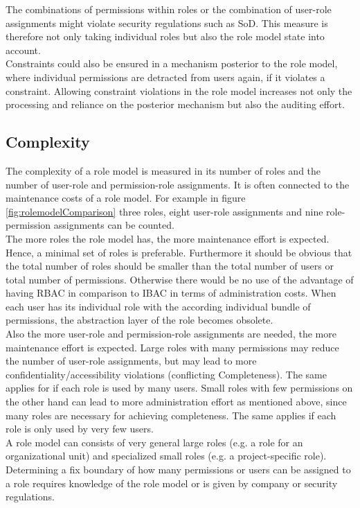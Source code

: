         The combinations of permissions within roles or the combination of user-role assignments might violate security regulations such as SoD. This measure is therefore not only taking individual roles but also the role model state into account.\\
        Constraints could also be ensured in a mechanism posterior to the role model, where individual permissions are detracted from users again, if it violates a constraint. Allowing constraint violations in the role model increases not only the processing and reliance on the posterior mechanism but also the auditing effort.
        \subsection{Complexity}
        The complexity of a role model is measured in its number of roles and the number of user-role and permission-role assignments. It is often connected to the maintenance costs of a role model. For example in figure \ref{fig:rolemodelComparison} three roles, eight user-role assignments and nine role-permission assignments can be counted.\\
        The more roles the role model has, the more maintenance effort is expected. Hence, a minimal set of roles is preferable. Furthermore it should be obvious that the total number of roles should be smaller than the total number of users or total number of permissions. Otherwise there would be no use of the advantage of having RBAC in comparison to IBAC in terms of administration costs. When each user has its individual role with the according individual bundle of permissions, the abstraction layer of the role becomes obsolete.\\
        Also the more user-role and permission-role assignments are needed, the more maintenance effort is expected. Large roles with many permissions may reduce the number of user-role assignments, but may lead to more confidentiality/accessibility violations (conflicting Completeness). The same applies for if each role is used by many users. Small roles with few permissions on the other hand can lead to more administration effort as mentioned above, since many roles are necessary for achieving completeness. The same applies if each role is only used by very few users.\\
        A role model can consists of very general large roles (e.g. a role for an organizational unit) and specialized small roles (e.g. a project-specific role). Determining a fix boundary of how many permissions or users can be assigned to a role requires knowledge of the role model or is given by company or security regulations.

